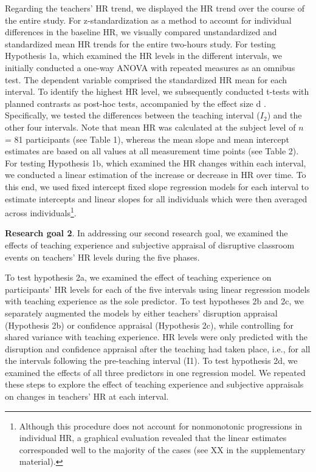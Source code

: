 \documentclass[]{elsarticle} %
\begin{document}
Regarding the teachers' HR trend, we displayed the HR trend over the
course of the entire study. For z-standardization as a method to account
for individual differences in the baseline HR, we visually compared
unstandardized and standardized mean HR trends for the entire two-hours
study. For testing Hypothesis 1a, which examined the HR levels in the
different intervals, we initially conducted a one-way ANOVA with
repeated measures as an omnibus test. The dependent variable comprised
the standardized HR mean for each interval. To identify the highest HR
level, we subsequently conducted t-tests with planned contrasts as
post-hoc tests, accompanied by the effect size d \citep{cohen1988new}.
Specifically, we tested the differences between the teaching interval
(\(I_2\)) and the other four intervals. Note that mean HR was calculated
at the subject level of \(n\) = 81 participants (see Table 1), whereas
the mean slope and mean intercept estimates are based on all values at
all measurement time points (see Table 2). For testing Hypothesis 1b,
which examined the HR changes within each interval, we conducted a
linear estimation of the increase or decrease in HR over time. To this
end, we used fixed intercept fixed slope regression models
\citep{gelman2006data} for each interval to estimate intercepts and
linear slopes for all individuals which were then averaged across
individuals\footnote{Although this procedure does not account for
  nonmonotonic progressions in individual HR, a graphical evaluation
  revealed that the linear estimates corresponded well to the majority
  of the cases (see XX in the supplementary material).}.

\textbf{Research goal 2}. In addressing our second research goal, we
examined the effects of teaching experience and subjective appraisal of
disruptive classroom events on teachers' HR levels during the five
phases.

To test hypothesis 2a, we examined the effect of teaching experience on
participants' HR levels for each of the five intervals using linear
regression models with teaching experience as the sole predictor. To
test hypotheses 2b and 2c, we separately augmented the models by either
teachers' disruption appraisal (Hypothesis 2b) or confidence appraisal
(Hypothesis 2c), while controlling for shared variance with teaching
experience. HR levels were only predicted with the disruption and
confidence appraisal after the teaching had taken place, i.e., for all
the intervals following the pre-teaching interval (I1). To test
hypothesis 2d, we examined the effects of all three predictors in one
regression model. We repeated these steps to explore the effect of
teaching experience and subjective appraisals on changes in teachers' HR
at each interval.


\end{document}
